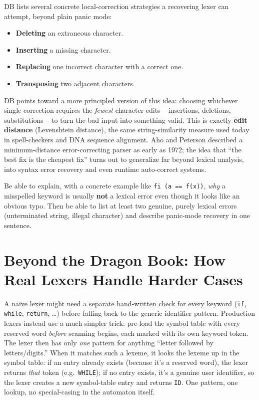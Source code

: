 \documentclass[full-course-notes.tex]{subfiles}
\begin{document}
\dbtag DB lists several concrete local-correction strategies a recovering lexer can attempt,
beyond plain panic mode:

\begin{itemize}
  \item \textbf{Deleting} an extraneous character.
  \item \textbf{Inserting} a missing character.
  \item \textbf{Replacing} one incorrect character with a correct one.
  \item \textbf{Transposing} two adjacent characters.
\end{itemize}

\begin{historynote}
DB points toward a more principled version of this idea: choosing whichever single correction
requires the \emph{fewest} character edits -- insertions, deletions, substitutions -- to turn
the bad input into something valid. This is exactly \textbf{edit distance} (Levenshtein
distance), the same string-similarity measure used today in spell-checkers and DNA sequence
alignment. Aho and Peterson described a minimum-distance error-correcting parser as early as
1972; the idea that ``the best fix is the cheapest fix'' turns out to generalize far beyond
lexical analysis, into syntax error recovery and even runtime auto-correct systems.
\end{historynote}

\begin{examfocus}
Be able to explain, with a concrete example like \texttt{fi (a == f(x))}, \emph{why} a
misspelled keyword is usually \textbf{not} a lexical error even though it looks like an obvious
typo. Then be able to list at least two genuine, purely lexical errors (unterminated string,
illegal character) and describe panic-mode recovery in one sentence.
\end{examfocus}

\section{Beyond the Dragon Book: How Real Lexers Handle Harder Cases}
\label{sec:l3-beyond-db}

\begin{enrichment}
A naive lexer might need a separate hand-written check for every keyword (\texttt{if},
\texttt{while}, \texttt{return}, \dots) before falling back to the generic identifier pattern.
Production lexers instead use a much simpler trick: pre-load the symbol table with every
reserved word \emph{before} scanning begins, each marked with its own keyword token. The lexer
then has only \emph{one} pattern for anything ``letter followed by letters/digits.'' When it
matches such a lexeme, it looks the lexeme up in the symbol table: if an entry already exists
(because it's a reserved word), the lexer returns \emph{that} token (e.g.\ \texttt{WHILE}); if
no entry exists, it's a genuine user identifier, so the lexer creates a new symbol-table entry
and returns \texttt{ID}. One pattern, one lookup, no special-casing in the automaton itself.
\end{enrichment}
\end{document}
